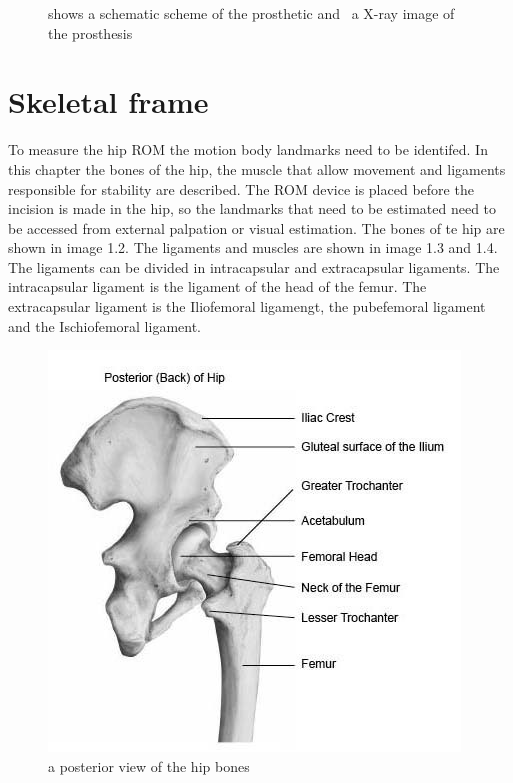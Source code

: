 \documentclass[whitelogo]{tudelft-report}
\begin{document}
{\begin{figure}[ht]
\begin{subfigure}{0.31\linewidth}
		\caption{\label{fig:fig2}}
	\end{subfigure}  
	\caption{ shows a schematic scheme of the prosthetic and~ a X-ray image of the prosthesis~\cite{holzwarth2012total}}
\end{figure}

\section{Skeletal frame}
To measure the hip ROM the motion body landmarks need to be identifed. In this chapter the bones of the hip, the muscle that allow movement and ligaments responsible for stability are described. 
\vspace{5mm}
The ROM device is placed before the incision is made in the hip, so the landmarks that need to be estimated need to be accessed from external palpation or visual estimation. The bones of te hip are shown in image 1.2. The ligaments and muscles are shown in image 1.3 and 1.4. The ligaments can be divided in intracapsular and extracapsular ligaments. The intracapsular ligament is the ligament of the head of the femur. The extracapsular ligament is the Iliofemoral ligamengt, the pubefemoral ligament and the Ischiofemoral ligament. 
	
\begin{figure}[!htb]
		\centering\includegraphics[width=1\linewidth]{hip_bones.jpg}
		\caption{a posterior view of the hip bones~\cite{Hipligaments2018}}
\end{figure}	

}
\end{document}
